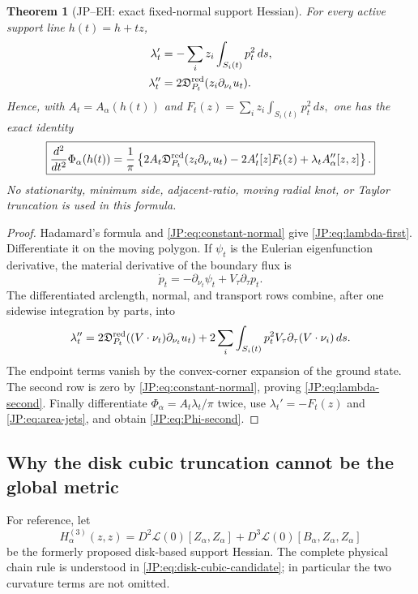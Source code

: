 \documentclass[11pt]{amsart}
\numberwithin{equation}{section}
\newtheorem{theorem}{Theorem}[section]
\theoremstyle{definition}
\theoremstyle{remark}
\newcommand{\Dred}{\mathfrak D^{\rm red}}
\begin{document}
\begin{theorem}[JP--EH: exact fixed-normal support Hessian]
\label{JP:thm:EH}
For every active support line $h(t)=h+tz$,
\begin{align}
 \lambda_t'&=-\sum_i z_i\int_{S_i(t)}p_t^2\,ds,
 \label{JP:eq:lambda-first}\\
 \lambda_t''&=2\Dred_{P_t}(z_i\partial_{\nu_t}u_t).
 \label{JP:eq:lambda-second}
\end{align}
Hence, with $A_t=A_\alpha(h(t))$ and
\(
 F_t(z)=\sum_i z_i\int_{S_i(t)}p_t^2\,ds,
\)
one has the exact identity
\begin{equation}\label{JP:eq:Phi-second}
 \boxed{
 \frac{d^2}{dt^2}\Phi_\alpha(h(t))
 =\frac1\pi\left\{
 2A_t\Dred_{P_t}(z_i\partial_{\nu_t}u_t)
 -2A_t'[z]F_t(z)+\lambda_t A_\alpha''[z,z]
 \right\}.}
\end{equation}
No stationarity, minimum side, adjacent-ratio, moving radial knot, or
Taylor truncation is used in this formula.
\end{theorem}

\begin{proof}
Hadamard's formula and \eqref{JP:eq:constant-normal} give
\eqref{JP:eq:lambda-first}.  Differentiate it on the moving polygon.  If
$\psi_t$ is the Eulerian eigenfunction derivative, the material derivative
of the boundary flux is
\[
 \dot p_t=-\partial_{\nu_t}\psi_t+V_\tau\partial_\tau p_t.
\]
The differentiated arclength, normal, and transport rows combine, after
one sidewise integration by parts, into
\[
 \lambda_t''=2\Dred_{P_t}((V\cdot\nu_t)\partial_{\nu_t}u_t)
 +2\sum_i\int_{S_i(t)}p_t^2V_\tau
          \partial_\tau(V\cdot\nu_i)\,ds.
\]
The endpoint terms vanish by the convex-corner expansion of the ground
state.  The second row is zero by \eqref{JP:eq:constant-normal}, proving
\eqref{JP:eq:lambda-second}.  Finally differentiate
$\Phi_\alpha=A_t\lambda_t/\pi$ twice, use
$\lambda_t'=-F_t(z)$ and \eqref{JP:eq:area-jets}, and obtain
\eqref{JP:eq:Phi-second}.
\end{proof}

\subsection{Why the disk cubic truncation cannot be the global metric}

For reference, let
\begin{equation}\label{JP:eq:disk-cubic-candidate}
 H^{(3)}_\alpha(z,z)
 =D^2\mathcal L(0)[Z_\alpha,Z_\alpha]
  +D^3\mathcal L(0)[B_\alpha,Z_\alpha,Z_\alpha]
\end{equation}
be the formerly proposed disk-based support Hessian.  The complete physical
chain rule is understood in \eqref{JP:eq:disk-cubic-candidate}; in particular
the two curvature terms are not omitted.
\end{document}
